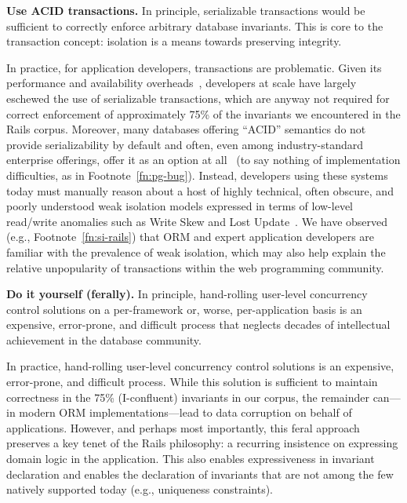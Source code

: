 \begin{impenumerate}
\item \textbf{Use ACID transactions.} In principle, serializable
  transactions would be sufficient to correctly enforce arbitrary
  database invariants. This is core to the transaction concept:
  isolation is a means towards preserving integrity. \vspace{.5em}

  \indent In practice, for application developers, transactions are
  problematic. Given its performance and availability
  overheads~\cite{brewer-cap}, developers at scale have largely
  eschewed the use of serializable transactions, which are anyway not
  required for correct enforcement of approximately 75\% of the
  invariants we encountered in the Rails corpus. Moreover, many
  databases offering ``ACID'' semantics do not provide serializability
  by default and often, even among industry-standard enterprise
  offerings, offer it as an option at all~\cite{hat-vldb} (to say
  nothing of implementation difficulties, as in
  Footnote~\ref{fn:pg-bug}). Instead, developers using these systems
  today must manually reason about a host of highly technical, often
  obscure, and poorly understood weak isolation models expressed in
  terms of low-level read/write anomalies such as Write Skew and Lost
  Update~\cite{adya-isolation,consistency-borders}. We have observed
  (e.g., Footnote~\ref{fn:si-rails}) that ORM and expert application
  developers are familiar with the prevalence of weak isolation, which
  may also help explain the relative unpopularity of transactions
  within the web programming community.

\item\textbf{Do it yourself (ferally).} In principle, hand-rolling
  user-level concurrency control solutions on a per-framework
  or, worse, per-application basis is an expensive, error-prone, and
  difficult process that neglects decades of intellectual achievement
  in the database community.\vspace{.5em}
  
  In practice, hand-rolling user-level concurrency control solutions
  is an expensive, error-prone, and difficult process. While this
  solution is sufficient to maintain correctness in the 75\%
  (I-confluent) invariants in our corpus, the remainder can---in
  modern ORM implementations---lead to data corruption on behalf of
  applications. However, and perhaps most importantly, this feral
  approach preserves a key tenet of the Rails philosophy: a recurring
  insistence on expressing domain logic in the application. This also
  enables expressiveness in invariant declaration and enables the
  declaration of invariants that are not among the few natively
  supported today (e.g., uniqueness constraints).
\end{impenumerate}


